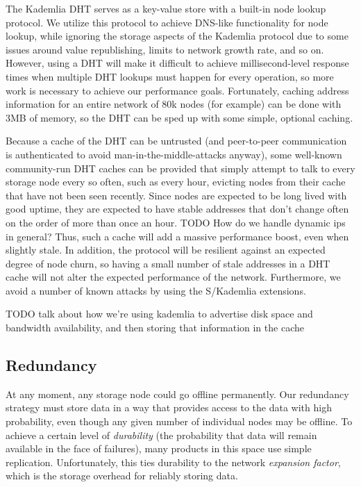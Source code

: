 \documentclass[a4paper,10pt]{article} \usepackage[utf8]{inputenc}
\newcommand{\todo}[1]{{\color{red} TODO #1 }}
\begin{document}
The Kademlia DHT serves as a key-value store with a built-in node lookup
protocol. We utilize this protocol to achieve DNS-like functionality for node
lookup, while ignoring the storage aspects of the Kademlia protocol due to some
issues around value republishing, limits to network growth rate, and so on.
However, using a DHT will make it difficult to achieve millisecond-level
response times when multiple DHT lookups must happen for every operation, so
more work is necessary to achieve our performance goals. Fortunately, caching
address information for an entire network of 80k nodes (for example) can be done
with 3MB of memory, so the DHT can be sped up with some simple, optional
caching.

Because a cache of the DHT can be untrusted (and peer-to-peer communication is
authenticated to avoid man-in-the-middle-attacks anyway), some well-known
community-run DHT caches can be provided that simply attempt to talk to every
storage node every so often, such as every hour, evicting nodes from their
cache that have not been seen recently.
Since nodes are expected to be long lived with good uptime, they
are expected to have stable addresses that don't change often on the order of
more than once an hour. \todo{How do we handle dynamic ips in general?} Thus, such a cache will add a massive performance boost, even when slightly stale.
In addition, the protocol will be resilient against an expected degree of node
churn, so having a small number of stale addresses in a DHT cache will not alter
the expected performance of the network. Furthermore, we avoid a number of known
attacks by using the S/Kademlia extensions. \cite{skad}

\todo{talk about how we're using kademlia to advertise disk space and bandwidth
availability, and then storing that information in the cache}

\subsection{Redundancy}

At any moment, any storage node could go offline permanently. Our redundancy
strategy must store data in a way that provides access to the data with high
probability, even though any given number of individual nodes may be offline. To
achieve a certain level of {\em durability} (the probability that data will
remain available in the face of failures), many products in this space use
simple replication. Unfortunately, this ties durability to the network {\em
expansion factor}, which is the storage overhead for reliably storing data.
\end{document}
